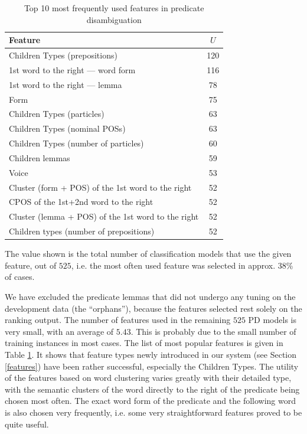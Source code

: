 \documentclass[12pt,notitlepage]{report}
\begin{document}
\begin{table}[tb]\footnotesize
\caption{Top 10 most frequently used features in predicate disambiguation}\label{tab:feats-pd}
\begin{center}
\begin{tabular}{|l|c|}\hline
\bf Feature & \bf $U$ \\\hline
Children Types (prepositions) & 120 \\
1st word to the right --- word form & 116 \\
1st word to the right --- lemma & 78 \\
Form & 75 \\
Children Types (particles) & 63 \\
Children Types (nominal POSs) & 63 \\
Children Types (number of particles) & 60 \\
Children lemmas & 59 \\
Voice & 53 \\
Cluster (form + POS) of the 1st word to the right & 52 \\
CPOS of the 1st+2nd word to the right & 52 \\
Cluster (lemma + POS) of the 1st word to the right & 52 \\
Children types (number of prepositions) & 52 \\\hline
\end{tabular}
\end{center}
The value shown is the total number of classification models that use the given feature, out of $525$, i.e. the most often used feature was selected in approx. 38\% of cases.
\end{table}

We have excluded the predicate lemmas that did not undergo any tuning on the development data (the ``orphans''), because the features selected rest solely on the ranking output. The number of features used in the remaining $525$ PD models is very small, with an average of $5.43$. This is probably due to the small number of training instances in most cases. The list of most popular features is given in Table \ref{tab:feats-pd}. It shows that feature types newly introduced in our system (see Section \ref{features}) have been rather successful, especially the Children Types. The utility of the features based on word clustering varies greatly with their detailed type, with the semantic clusters of the word directly to the right of the predicate being chosen most often. The exact word form of the predicate and the following word is also chosen very frequently, i.e. some very straightforward features proved to be quite useful.
\end{document}
